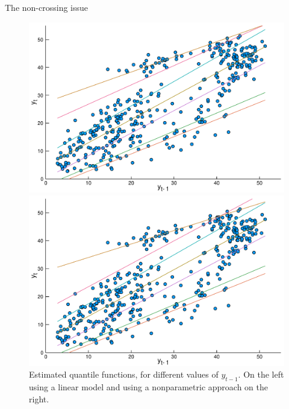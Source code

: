 \begin{frame}{The non-crossing issue}

\begin{figure}
  \centering
  \begin{minipage}[t]{\linewidth}
    \centering
    \begin{minipage}[t]{0.45\linewidth}
      \centering     \includegraphics[width=\textwidth]{Imagens/icaraizinho-quantile-linear-scatter}
    \end{minipage}
    \begin{minipage}[t]{0.45\linewidth}
      \centering     \includegraphics[width=\textwidth]{Imagens/icaraizinho-quantile-linear-scatter-crossing}
    \end{minipage}
  \end{minipage}
  \caption{Estimated quantile functions, for different values of $y_{t-1}$. On the left using a linear model and using a nonparametric approach on the right.}
  \label{fig:quantiles-vs-xt}
\end{figure}

\end{frame}

